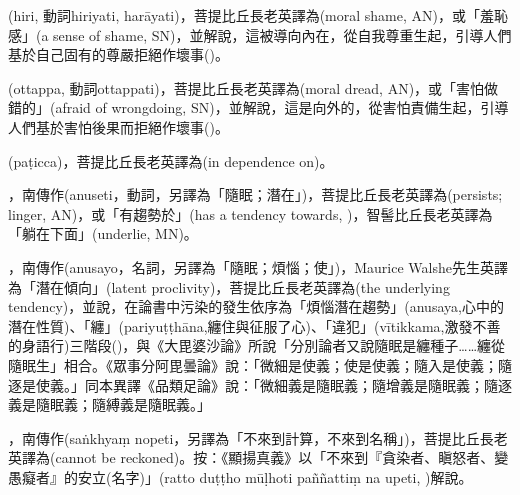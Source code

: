 \startitemgroup[noteitems]
\item{}(hiri, 動詞hiriyati, harāyati)，菩提比丘長老英譯為(moral shame, AN)，或「羞恥感」(a sense of shame, SN)，並解說，這被導向內在，從自我尊重生起，引導人們基於自己固有的尊嚴拒絕作壞事()。
\stopitemgroup

\startitemgroup[noteitems]
\item{}(ottappa, 動詞ottappati)，菩提比丘長老英譯為(moral dread, AN)，或「害怕做錯的」(afraid of wrongdoing, SN)，並解說，這是向外的，從害怕責備生起，引導人們基於害怕後果而拒絕作壞事()。
\stopitemgroup

\startitemgroup[noteitems]
\item{}(paṭicca)，菩提比丘長老英譯為(in dependence on)。
\stopitemgroup

\startitemgroup[noteitems]
\item{}，南傳作(anuseti，動詞，另譯為「隨眠；潛在」)，菩提比丘長老英譯為(persists; linger, AN)，或「有趨勢於」(has a tendency towards, )，智髻比丘長老英譯為「躺在下面」(underlie, MN)。
\item{}，南傳作(anusayo，名詞，另譯為「隨眠；煩惱；使」)，Maurice Walshe先生英譯為「潛在傾向」(latent proclivity)，菩提比丘長老英譯為(the underlying tendency)，並說，在論書中污染的發生依序為「煩惱潛在趨勢」(anusaya,心中的潛在性質)、「纏」(pariyuṭṭhāna,纏住與征服了心)、「違犯」(vītikkama,激發不善的身語行)三階段()，與《大毘婆沙論》所說「分別論者又說隨眠是纏種子……纏從隨眠生」相合。《眾事分阿毘曇論》說：「微細是使義；使是使義；隨入是使義；隨逐是使義。」同本異譯《品類足論》說：「微細義是隨眠義；隨增義是隨眠義；隨逐義是隨眠義；隨縛義是隨眠義。」
\stopitemgroup

\startitemgroup[noteitems]
\item{}，南傳作(saṅkhyaṃ nopeti，另譯為「不來到計算，不來到名稱」)，菩提比丘長老英譯為(cannot be reckoned)。按：《顯揚真義》以「不來到『貪染者、瞋怒者、變愚癡者』的安立(名字)」(ratto duṭṭho mūḷhoti paññattiṃ na upeti, )解說。
\stopitemgroup

